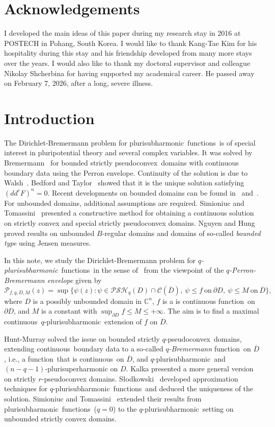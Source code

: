 \documentclass[reqno]{amsart}
\theoremstyle{definition}
\numberwithin{equation}{section}
\newcommand{\cbb}{\mathbb{C}}
\newcommand{\ccal}{\mathcal{C}}
\newcommand{\pcal}{\mathcal{P}}
\newcommand{\psh}{pluri\-sub\-harmonic}
\newcommand{\qpsh}{$q$-pluri\-sub\-harmonic}
\newcommand{\PSH}{\mathcal{PSH}}
\newcommand{\spsc}{strictly pseudo\-convex}
\newcommand{\qpsc}{$q$-pseudo\-convex}
\newcommand{\cont}{continuous}
\newcommand{\fct}{function}
\newcommand{\fcts}{functions}
\newcommand{\cld}{\overline{D}}
\begin{document}
\section*{Acknowledgements}

I developed the main ideas of this paper during my research stay in 2016 at POSTECH in Pohang, South Korea. I would like to thank Kang-Tae Kim for his hospitality during this stay and his friendship developed from many more stays over the years. I would also like to thank my doctoral supervisor and colleague Nikolay Shcherbina for having supported my academical career. He passed away on February 7, 2026, after a long, severe illness. 


\section{Introduction}\label{intro}

The Dirichlet-Bremermann problem for \psh\ \fcts\ is of special interest in pluripotential theory and several complex variables. It was solved by Bremermann~\cite{Br} for bounded \spsc\ domains with continuous boundary data using the Perron envelope. Continuity of the solution is due to Walsh~\cite{Wa}. Bedford and Taylor~\cite{BT} showed that it is the unique solution satisfying $(dd^c F)^n=0$. Recent developments on bounded domains can be found in~\cite{Nil} and~\cite{NTT}. For unbounded domains, additional assumptions are required. Simioniuc and Tomassini~\cite{SiTo} presented a constructive method for obtaining a continuous solution on strictly convex and  special strictly pseudoconvex domains. Nguyen and Hung~\cite{NH} proved results on unbounded $B$-regular domains and domains of so-called \textit{bounded type} using Jensen measures.

In this note, we study the Dirichlet-Bremermann problem for \textit{\qpsh}\ \fcts\ in the sense of~\cite{HM} from the viewpoint of the \textit{$q$-Perron-Bremermann envelope} given by
\[
\pcal_{f,q,D,M}(z)=\sup\{\psi(z) : \psi \in \PSH_q(D) \cap{\ccal(\cld)}, \ \psi \leq f \ \text{on}\ \partial D, \ \psi\leq M \ \text{on}\ \cld\},
\]
where $D$ is a possibly unbounded domain in $\cbb^n$, $f$ is a is continuous \fct\ on $\partial D$, and $M$ is a constant with $\sup_{\partial D} f \leq M \leq +\infty$. The aim is to find a maximal \cont\ \qpsh\ extension of $f$ on $\cld$.

Hunt-Murray \cite{HM} solved the issue on bounded strictly \qpsc\ domains, extending \cont\ boundary data to a so-called \textit{$q$-Bremermann} \fct\ on $\cld$, i.e., a \fct\ that is \cont\ on $\cld$, and \qpsh\ and $(n-q-1)$-plurisuperharmonic on $D$. Kalka \cite{Ka} presented a more general version on strictly $r$-pseudoconvex domains. S\l{}odkowski~\cite{Sl84} developed approximation techniques for \qpsh\ \fcts\ and deduced the uniqueness of the solution. Simioniuc and Tomassini~\cite{SiTo} extended their results from \psh\ \fcts\ ($q=0$) to the \qpsh\ setting on unbounded strictly convex domains.
\end{document}
